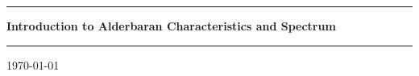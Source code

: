
\begin{titlepage}
\begin{center}
\vspace{2cm}
\vspace{2cm}

\vspace{2cm}

\hrule
\vspace{.5cm}
{ \huge \bfseries Introduction to Alderbaran Characteristics and Spectrum} %
\vspace{.5cm}

\hrule
\vspace{1.5cm}

\vspace{4cm}

\centering \today %
\end{center}
\end{titlepage}